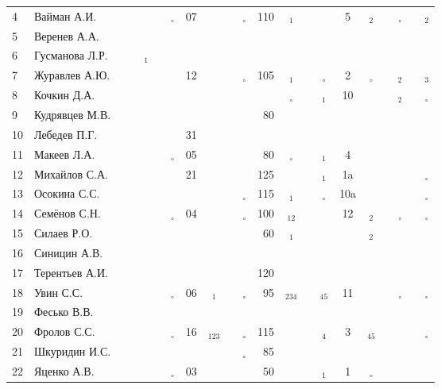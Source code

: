 \documentclass[a4paper,landscape,11pt]{article}
\newcommand*\OK{&\small \ding{51}$\!\!_\circ$} %
\newcommand*\Ok{&\small \ding{51}$\!\!_\circ$} %
\newcommand*\ok{&{\small \ding{51}}} %
\newcommand*\no{&{\small }} %
\newcommand*\da{&{\small\ding{48}$\!\!_1$}} %
\newcommand*\ab{&{\small\ding{48}$\!\!_{12}$}} %
\newcommand*\dabc{&{\small\ding{48}$\!\!_{123}$}} %
\newcommand*\db{&{\small\ding{48}$\!\!_2$}} %
\newcommand*\dc{&{\small\ding{48}$\!\!_3$}} %
\newcommand*\dd{&{\small\ding{48}$\!\!_4$}} %
\newcommand*\bd{&{\small\ding{48}$\!\!_{234}$}} %
\newcommand*\de{&{\small\ding{48}$\!\!_{45}$}} %
\begin{document}
\begin{tabular}{l|l|cccccccccrccccccccc}
 4&Вайман А.И.     \no\no\no\ok\OK&07\ok  \ok\OK&110\da\ok\ok&  5\db\ok\Ok\ok\db\\
 5&Веренев А.А.    \no\no\no\no\ok\no\no  \ok\ok \no\no\no\no \no\ok\no\no\no\no\\
 6&Гусманова Л.Р.  \ok\ok\da\ok\no\no\no  \no\no \no\no\no\no \no\no\no\no\no\no\\
 7&Журавлев А.Ю.   \no\no\no\no\ok&12\ok  \ok\OK&105\da\ok\Ok&  2\Ok\ok\db\ok\dc\\
 8&Кочкин Д.А.     \no\no\no\no\ok\ok\no  \ok\no \no\Ok\no\da& 10\no\no\db\ok\Ok\\
 9&Кудрявцев М.В.  \no\no\ok\ok\no\no\no  \ok\ok& 80\ok\ok\no \no\no\no\no\no\no\\
10&Лебедев П.Г.    \ok\ok\no\ok\ok&31\no  \ok\no \no\no\no\no \no\no\ok\ok\ok\no\\
11&Макеев Л.А.     \ok\ok\ok\ok\OK&05\ok  \ok\ok& 80\Ok\ok\da&  4\ok\ok\ok\ok\no\\
\midrule
12&Михайлов С.А.   \no\no\ok\ok\ok&21\no  \ok\ok&125\ok\ok\da& 1a\ok\ok\ok\ok\Ok\\
13&Осокина С.С.    \ok\ok\ok\ok\no\no\ok  \ok\OK&115\da\no\Ok&10a\ok\no\ok\no\Ok\\
14&Семёнов С.Н.    \ok\ok\ok\ok\OK&04\ok  \ok\OK&100\ab\ok\ok& 12\db\no\Ok\ok\Ok\\
15&Силаев Р.О.     \ok\ok\no\no\no\no\no  \no\ok& 60\da\ok\no \no\db\no\ok\no\no\\
16&Синицин А.В.    \ok\ok\no\ok\no\no\no  \no\no \no\no\no\no \no\no\no\no\no\no\\
17&Терентьев А.И.  \ok\ok\ok\ok\no\no\no  \no\ok&120\no\no\no \no\no\no\no\no\no\\
18&Увин С.С.       \ok\ok\ok\ok\OK&06\da  \ok\OK& 95\bd\ok\de& 11\ok\ok\Ok\ok\Ok\\
19&Фесько В.В.     \no\no\no\no\no\no\no  \no\no \no\no\no\no \no\no\no\no\no\no\\
20&Фролов С.С.     \ok\ok\ok\ok\OK&16\dabc\ok\OK&115\ok\ok\dd&  3\de\ok\ok\ok\Ok\\ 
21&Шкуридин И.С.   \ok\ok\ok\ok\ok\no\ok  \ok\OK& 85\ok\ok\no \no\ok\no\no\no\no\\
22&Яценко А.В.     \ok\ok\ok\ok\OK&03\ok  \ok\ok& 50\ok\ok\da&  1\Ok\no\no\no\no\\ 
\bottomrule
\end{tabular} 
\newpage
\end{document}
